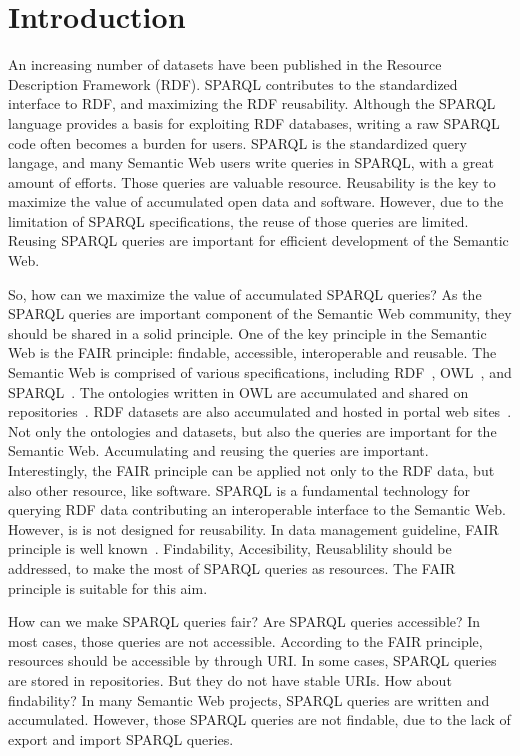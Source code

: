\documentclass[runningheads]{llncs}
\begin{document}
\section{Introduction}
An increasing number of datasets have been published in the Resource Description Framework (RDF).
SPARQL contributes to the standardized interface to RDF, and maximizing the RDF reusability. 
Although the SPARQL language provides a basis for exploiting RDF databases, writing a raw SPARQL code often becomes a burden for users. 
SPARQL is the standardized query langage, and many Semantic Web users write queries in SPARQL, with a great amount of efforts.
Those queries are valuable resource.
Reusability is the key to maximize the value of accumulated open data and software.
However, due to the limitation of SPARQL specifications, the reuse of those queries are limited. 
Reusing SPARQL queries are important for efficient development of the Semantic Web.

So, how can we maximize the value of accumulated SPARQL queries?
As the SPARQL queries are important component of the Semantic Web community,
they should be shared in a solid principle.
One of the key principle in the Semantic Web is the FAIR principle: findable, accessible, interoperable and reusable.
The Semantic Web is comprised of various specifications, including RDF~\cite{rdf}, OWL~\cite{owl}, and SPARQL~\cite{sparql}. The ontologies written in OWL are accumulated and shared on repositories~\cite{bioportal}.
RDF datasets are also accumulated and hosted in portal web sites~\cite{rdf-portal}.
Not only the ontologies and datasets, but also the queries are important for the Semantic Web.
Accumulating and reusing the queries are important.
Interestingly, the FAIR principle can be applied not only to the RDF data, but also other resource, like software.
SPARQL is a fundamental technology for querying RDF data contributing an interoperable interface to the Semantic Web. However, is is not designed for reusability. 
In data management guideline, FAIR principle is well known~\cite{fair}. Findability, Accesibility, Reusablility should be addressed, to make the most of SPARQL queries as resources. 
The FAIR principle is suitable for this aim.

How can we make SPARQL queries fair? Are SPARQL queries accessible? In most cases, those queries are not accessible. According to the FAIR principle, resources should be accessible by through URI. In some cases, SPARQL queries are stored in repositories. But they do not have stable URIs. How about findability? In many Semantic Web projects, SPARQL queries are written and accumulated. However, those SPARQL queries are not findable, due to the lack of export and import SPARQL queries.
\end{document}
